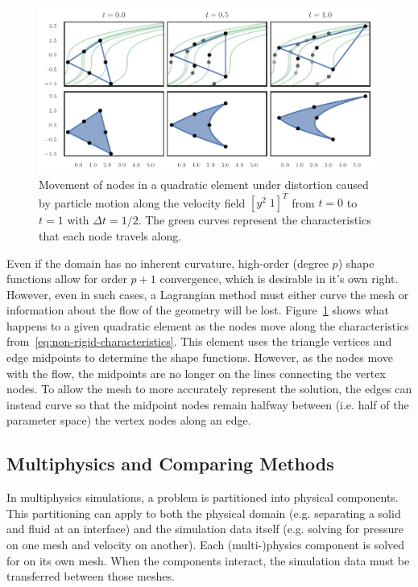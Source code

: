\begin{figure}
  \includegraphics{../images/curved-mesh/element_distortion.pdf}
  \centering
  \captionsetup{width=.75\linewidth}
  \caption{Movement of nodes in a quadratic element under distortion caused
    by particle motion along the velocity field \(\left[ y^2 \; 1 \right]^T\)
    from \(t = 0\) to \(t = 1\) with \(\Delta t = 1/2\). The green curves
    represent the characteristics that each node travels along.}
  \label{fig:element-distortion}
\end{figure}

Even if the domain has no inherent curvature, high-order (degree \(p\)) shape
functions allow for order \(p + 1\) convergence, which is desirable in
it's own right. However, even in such cases, a Lagrangian method must either
curve the mesh or information about the flow of the geometry will be lost.
Figure~\ref{fig:element-distortion} shows what happens to a given
quadratic element as the nodes move along the
characteristics from~\eqref{eq:non-rigid-characteristics}.
This element uses the triangle vertices and edge
midpoints to determine the shape functions. However, as the nodes move
with the flow, the midpoints are no longer on the lines connecting
the vertex nodes. To allow the mesh to more accurately represent the
solution, the edges can instead curve so that the midpoint nodes remain
halfway between (i.e. half of the parameter space) the vertex nodes along
an edge.

\subsection{Multiphysics and Comparing Methods}

In multiphysics simulations, a problem is partitioned into physical components.
This partitioning can apply to both the physical domain (e.g. separating a
solid and fluid at an interface) and the simulation data itself (e.g. solving
for pressure on one mesh and velocity on another). Each (multi-)physics
component is solved for on its own mesh. When the components interact, the
simulation data must be transferred between those meshes.

